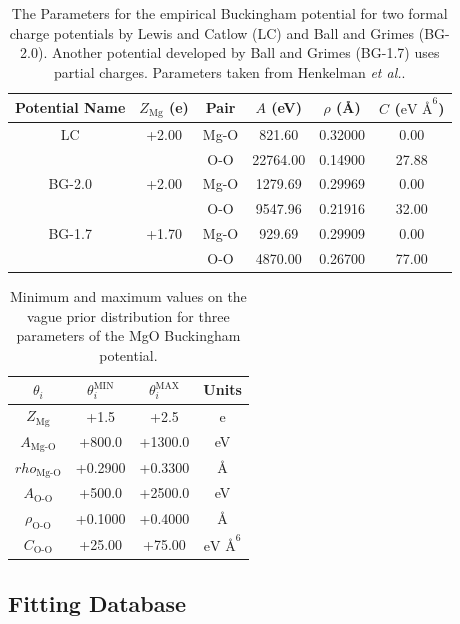 \begin{table}[ht]
	\caption{The Parameters for the empirical Buckingham potential for two formal charge potentials by Lewis and Catlow (LC)\cite{lewis1985_buckingham} and Ball and Grimes (BG-2.0). Another potential developed by Ball and Grimes (BG-1.7) uses partial charges. Parameters taken from Henkelman \emph{et al.}\cite{henkelman2005_buckingham_MgO}.}
	\label{tlb:MgO_prior_potentials}
	\centering
	\begin{tabular}{cccccc}
		\hline
		{Potential Name} & {$Z_{\text{Mg}}$ (e)} & Pair	 & $A$ (eV) & $\rho$ (\AA)	& $C$ ($\text{eV \AA}^6$) \\
		\hline
		LC	&    +2.00   &  Mg-O   &	 821.60  &   0.32000  &  0.00 \\
			  &            &   O-O	 & 22764.00	 &   0.14900  & 27.88 \\
		BG-2.0 & +2.00   &	Mg-O	 &  1279.69  &   0.29969  &  0.00 \\
		       &         & 	 O-O	 &  9547.96	 &   0.21916	& 32.00 \\
		BG-1.7 &  +1.70  &  Mg-O   &   929.69  &   0.29909  &	 0.00 \\
           &         &   O-O   &  4870.00	 &   0.26700  &	77.00 \\
		\hline
	\end{tabular}
\end{table}

\begin{table}[ht]
	\caption{Minimum and maximum values on the vague prior distribution for three parameters of the MgO Buckingham potential.}
	\label{tbl:MgO_inital_distribution}
	\centering
	\begin{tabular}{cccc}
    \hline
		$\theta_i$ & $\theta_i^{\text{MIN}}$ & $\theta_i^{\text{MAX}}$ & Units \\
		\hline
		$Z_{\text{Mg}}$ & +1.5 & +2.5 & e \\
		$A_{\text{Mg-O}}$ & +800.0 & +1300.0 & eV \\
		$rho_{\text{Mg-O}}$ & +0.2900 & +0.3300 & \AA \\
		$A_{\text{O-O}}$ & +500.0 & +2500.0 & eV \\
		$\rho_{\text{O-O}}$ & +0.1000 & +0.4000 & \AA \\
		$C_{\text{O-O}}$ & +25.00 & +75.00 & $\text{eV \AA}^6$ \\
	  \hline
	\end{tabular}
\end{table}

\subsection{Fitting Database}

